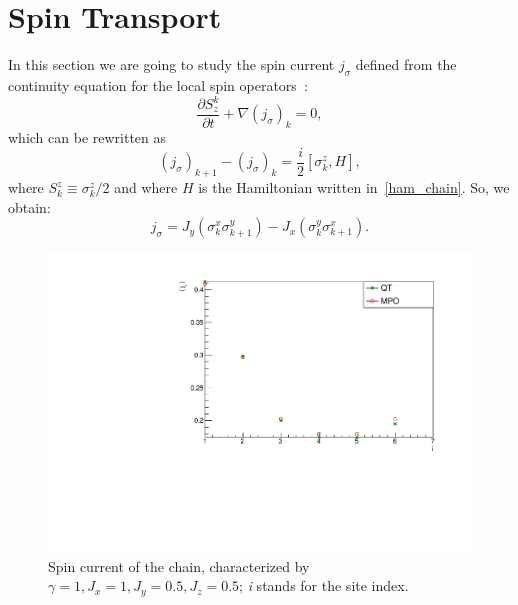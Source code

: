 \section{Spin Transport}
In this section we are going to study the spin current $j_\sigma$ defined from the continuity equation for the local spin operators~\cite{BenentiCasatiProsenRossini}:
\begin{equation}
    \frac{\partial S^k_z}{\partial t} + \nabla (j_\sigma)_k = 0,
\end{equation}
which can be rewritten as
\begin{equation}
    (j_\sigma)_{k+1}-(j_\sigma)_k = \frac{i}{2}[\sigma_k^z , H],
\end{equation}
where $S_k^z \equiv \sigma_k^z/2$ and where $H$ is the Hamiltonian written in~\ref{ham_chain}. So, we obtain:
\begin{equation}
    j_\sigma = J_y (\sigma_k^x \sigma_{k+1}^y) - J_x (\sigma_k^y \sigma_{k+1}^x). 
\end{equation}


\begin{figure}[H]
    \centering
    \includegraphics[scale=0.7]{Figures/8sites/SpinCurr_8s_J10505.pdf}
    \caption{Spin current of the chain, characterized by $\gamma=1, J_x=1, J_y=0.5, J_z=0.5$; \emph{i} stands for the site index.}
    \label{fig:my_label}
\end{figure}

